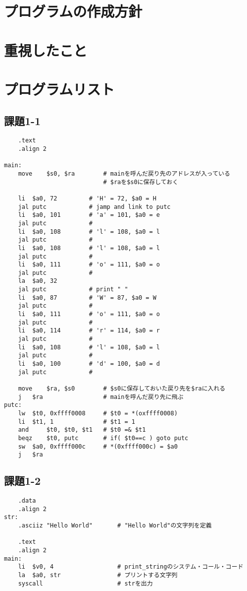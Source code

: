 \documentclass[9pt]{jarticle}
\begin{document}
\section{プログラムの作成方針}






\section{重視したこと}







\section{プログラムリスト}

\subsection{課題1-1}
\begin{verbatim}
	.text
	.align 2
	
main:
	move	$s0, $ra		# mainを呼んだ戻り先のアドレスが入っている
							# $raを$s0に保存しておく
	
	li	$a0, 72			# 'H' = 72, $a0 = H 
	jal	putc			# jamp and link to putc
	li	$a0, 101		# 'a' = 101, $a0 = e
	jal	putc			# 
	li	$a0, 108		# 'l' = 108, $a0 = l
	jal	putc			#
	li	$a0, 108		# 'l' = 108, $a0 = l
	jal	putc			# 
	li	$a0, 111		# 'o' = 111, $a0 = o
	jal	putc			# 
	la	$a0, 32
	jal	putc			# print " "
	li	$a0, 87			# 'W' = 87, $a0 = W
	jal	putc			#
	li	$a0, 111		# 'o' = 111, $a0 = o
	jal	putc			#
	li	$a0, 114		# 'r' = 114, $a0 = r
	jal	putc			#
	li	$a0, 108		# 'l' = 108, $a0 = l
	jal	putc			#
	li	$a0, 100		# 'd' = 100, $a0 = d
	jal	putc			#

	move	$ra, $s0		# $s0に保存しておいた戻り先を$raに入れる
	j	$ra					# mainを呼んだ戻り先に飛ぶ
putc:
	lw	$t0, 0xffff0008		# $t0 = *(oxffff0008)
	li	$t1, 1				# $t1 = 1
	and 	$t0, $t0, $t1	# $t0 =& $t1
	beqz	$t0, putc		# if( $t0==c ) goto putc
	sw	$a0, 0xffff000c		# *(0xffff000c) = $a0
	j	$ra

\end{verbatim}

\subsection{課題1-2}
\begin{verbatim}
	.data
	.align 2
str:
	.asciiz "Hello World"		# "Hello World"の文字列を定義

	.text
	.align 2
main:								
	li	$v0, 4					# print_stringのシステム・コール・コード	
	la	$a0, str 				# プリントする文字列
	syscall						# strを出力
	
\end{verbatim}
\end{document}
